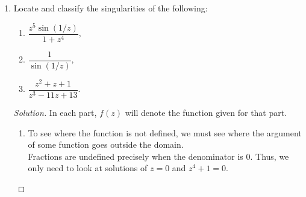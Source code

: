 \documentclass[12pt]{article}
\theoremstyle{definition}
\newenvironment{soln}{\begin{proof}[Solution]}{\end{proof}}
\begin{document}
\begin{enumerate}
\begin{soln}
		Thus, the task is now to compute $f^{(2n)}(0).$ Note that $f^{(2n)}(0)/(2n)!$ is precisely the coefficient of $z^{2n}$ in the expansion of 
		\begin{equation*} 
			(z^2 + 1)^{2n}.
		\end{equation*}

		Use binomial expansion, we see that
		\begin{align*} 
			(z^2 + 1)^{2n} &= \sum_{k=0}^{2n}\dbinom{2n}{k}(z^2)^{k}.
		\end{align*}
		Thus, the desired coefficient is $\dbinom{2n}{n}$ and the integral is
		\begin{equation*} 
			\int_{|z| = 1}^{} \left(z + \dfrac{1}{z}\right)^{2n}\dfrac{1}{z} {\mathrm{d}}z = 2\pi\iota\dbinom{2n}{n}.
		\end{equation*}

		Now, we may compute the integral the menial way, i.e., by \emph{parameterising and solving.}

		Using the standard parameterisation of $z(t) = e^{\iota t}$ for $t \in [0, 2\pi],$ the integral becomes

		\begin{align*} 
			\int_{|z| = 1}^{} \left(z + \dfrac{1}{z}\right)^{2n}\dfrac{1}{z} {\mathrm{d}}z &= \int_{0}^{2\pi} (2\cos t)^{2n}\dfrac{1}{e^{\iota t}}(\iota e^{\iota t}) {\mathrm{d}}t\\
			&= 4^n\iota\int_{0}^{2\pi} \cos^{2n}(t) {\mathrm{d}}t.
		\end{align*}

		Equating it with the previous result gives us the desired answer.
	\end{soln}
	\item Locate and classify the singularities of the following:
	\begin{enumerate}
		\item $\dfrac{z^5\sin(1/z)}{1 + z^4},$
		\item $\dfrac{1}{\sin(1/z)},$
		\item $\dfrac{z^2 + z + 1}{z^3 - 11z + 13}.$
	\end{enumerate}
	\begin{soln}
		In each part, $f(z)$ will denote the function given for that part.
		\begin{enumerate}
			\item To see where the function is not defined, we must see where the argument of some function goes outside the domain.\\
			Fractions are undefined precisely when the denominator is $0.$ Thus, we only need to look at solutions of $z = 0$ and $z^4 + 1 = 0.$


\end{enumerate}
\end{soln}
\end{enumerate}
\end{document}
